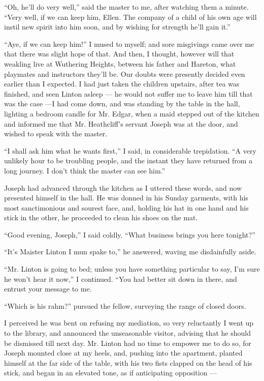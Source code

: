 \par “Oh, he'll do very well,” said the master to me, after watching them a minute. “Very well, if we can keep him, Ellen. The company of a child of his own age will instil new spirit into him soon, and by wishing for strength he'll gain it.”
\par “Aye, if we can keep him!” I mused to myself; and sore misgivings came over me that there was slight hope of that. And then, I thought, however will that weakling live at Wuthering Heights, between his father and Hareton, what playmates and instructors they'll be. Our doubts were presently decided even earlier than I expected. I had just taken the children upstairs, after tea was finished, and seen Linton asleep — he would not suffer me to leave him till that was the case —I had come down, and was standing by the table in the hall, lighting a bedroom candle for Mr. Edgar, when a maid stepped out of the kitchen and informed me that Mr. Heathcliff's servant Joseph was at the door, and wished to speak with the master.
\par “I shall ask him what he wants first,” I said, in considerable trepidation. “A very unlikely hour to be troubling people, and the instant they have returned from a long journey. I don't think the master can see him.”
\par Joseph had advanced through the kitchen as I uttered these words, and now presented himself in the hall. He was donned in his Sunday garments, with his most sanctimonious and sourest face, and, holding his hat in one hand and his stick in the other, he proceeded to clean his shoes on the mat.
\par “Good evening, Joseph,” I said coldly. “What business brings you here tonight?”
\par “It's Maister Linton I mun spake to,” he answered, waving me disdainfully aside.
\par “Mr. Linton is going to bed; unless you have something particular to say, I'm sure he won't hear it now,” I continued. “You had better sit down in there, and entrust your message to me.
\par “Which is his rahm?” pursued the fellow, surveying the range of closed doors.
\par I perceived he was bent on refusing my mediation, so very reluctantly I went up to the library, and announced the unseasonable visitor, advising that he should be dismissed till next day. Mr. Linton had no time to empower me to do so, for Joseph mounted close at my heels, and, pushing into the apartment, planted himself at the far side of the table, with his two fists clapped on the head of his stick, and began in an elevated tone, as if anticipating opposition —
